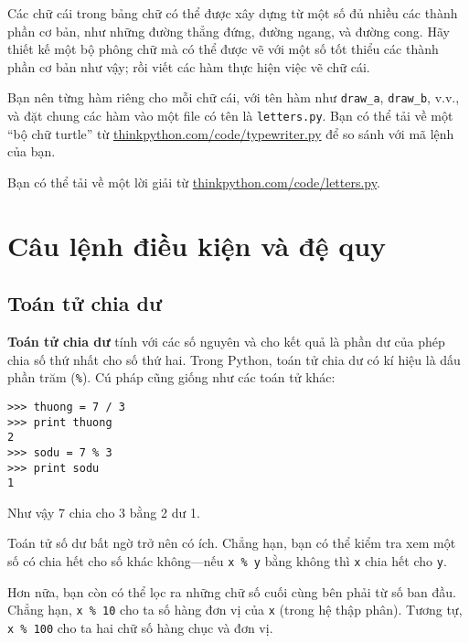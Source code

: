 \documentclass[11pt]{book}
\begin{document}
\begin{ex}

Các chữ cái trong bảng chữ có thể được xây dựng từ một số đủ
nhiều các thành phần cơ bản, như những đường thẳng đứng, đường
ngang, và đường cong. Hãy thiết kế một bộ phông chữ mà có thể
được vẽ với một số tốt thiểu các thành phần cơ bản như vậy; rồi
viết các hàm thực hiện việc vẽ chữ cái.

Bạn nên từng hàm riêng cho mỗi chữ cái, với tên hàm như 
\verb"draw_a", \verb"draw_b", v.v., và đặt chung các hàm vào một
file có tên là {\tt letters.py}.  Bạn có thể tải về một
``bộ chữ turtle'' từ \url{thinkpython.com/code/typewriter.py}
để so sánh với mã lệnh của bạn.

Bạn có thể tải về một lời giải từ \url{thinkpython.com/code/letters.py}.

\end{ex}



\chapter{Câu lệnh điều kiện và đệ quy}

\section{Toán tử chia dư}


{\bf Toán tử chia dư} tính với các số nguyên và cho kết quả là phần dư
của phép chia số thứ nhất cho số thứ hai. Trong Python, toán tử chia dư
có kí hiệu là dấu phần trăm (\verb"%").  Cú pháp cũng giống như các
toán tử khác:

\beforeverb
\begin{verbatim}
>>> thuong = 7 / 3
>>> print thuong
2
>>> sodu = 7 % 3
>>> print sodu
1
\end{verbatim}
\afterverb
%
Như vậy 7 chia cho 3 bằng 2 dư 1.

Toán tử số dư bất ngờ trở nên có ích. Chẳng hạn, bạn có thể kiểm tra 
xem một số có chia hết cho số khác không---nếu 
{\tt x \% y} bằng không thì {\tt x} chia hết cho {\tt y}.


Hơn nữa, bạn còn có thể lọc ra những chữ số cuối cùng bên phải từ
số ban đầu. Chẳng hạn, {\tt x \% 10} cho ta số hàng đơn vị của 
{\tt x} (trong hệ thập phân).  Tương tự, {\tt x \% 100} cho ta hai
chữ số hàng chục và đơn vị.
\end{document}

